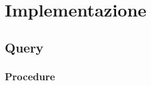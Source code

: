 \section{Implementazione}




\subsection{Query} %
\subsubsection{Procedure}

\begin{comment}
    operazione 1: inserimento di un nuovo prodotto
    operazione 2: cancellazione di un nuovo prodotto
    operazione 10: inserisci nuova prenotazione
    operazione 11: cancella prenotazione
    operazione 13: inserisci nuovo dipendente
    operazione 14: licenzia dipendente
    operazione 15: modifica lo stipendio del dipendente 
    operazione 17: modifica turno di lavoro

    operazione 3: stampa il nome e la quantità di tutti i cibi con data di scadenza al 10/12/2016
    opearzione 4: stampa la marca e il tipo di tutti i  vini o superalcolici, con annata risalente al 1987
    opearzione 5: stampa nome e PartitaIVA di tutti i fornitori che vendono almeno 2 cibi con tipo "fresco"
    opearzione 6: stampa il codice e il costo di tutte le uscite con causale "acqua" in data 3/6/2015
    opearzione 7: stampa il codice e il costo di tutte le entrate del giorno 21/10/2016
    opearzione 8: stampa il codice e il numero di persone di tutti gli ordini serviti dalla cameriera "Anna" il giorno 15/04/2015 al tavolo "18" 
    operazione 9: stampa il numero di tutti i tavoli prenotati il giorno 31/12/2016 
    operazione 12: stampa il codice di tutte le prenotazioni per il tavolo numero 5 il giorno 24/08/2015
    operazione 16: stampa nome cognome di tutti i dipendenti di turno il lunedì
\end{comment}

